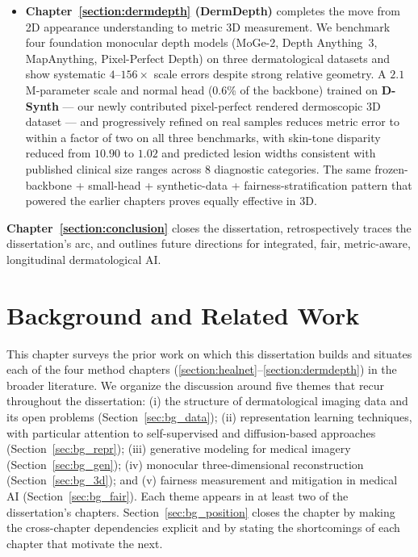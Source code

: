 \documentclass[11pt]{ucthesis}
\begin{document}
\begin{itemize}
  \item \textbf{Chapter~\ref{section:dermdepth} (DermDepth)} completes the move from 2D appearance understanding to metric 3D measurement. We benchmark four foundation monocular depth models (MoGe-2, Depth Anything~3, MapAnything, Pixel-Perfect Depth) on three dermatological datasets and show systematic $4$--$156\times$ scale errors despite strong relative geometry. A $2.1$\,M-parameter scale and normal head (0.6\% of the backbone) trained on \textbf{D-Synth} --- our newly contributed pixel-perfect rendered dermoscopic 3D dataset --- and progressively refined on real samples reduces metric error to within a factor of two on all three benchmarks, with skin-tone disparity reduced from $10.90$ to $1.02$ and predicted lesion widths consistent with published clinical size ranges across $8$ diagnostic categories. The same frozen-backbone + small-head + synthetic-data + fairness-stratification pattern that powered the earlier chapters proves equally effective in 3D.
\end{itemize}

\textbf{Chapter~\ref{section:conclusion}} closes the dissertation, retrospectively traces the dissertation's arc, and outlines future directions for integrated, fair, metric-aware, longitudinal dermatological AI.

\chapter{Background and Related Work}\label{section:bg}

This chapter surveys the prior work on which this dissertation builds and situates each of the four method chapters (\ref{section:healnet}--\ref{section:dermdepth}) in the broader literature. We organize the discussion around five themes that recur throughout the dissertation: (i) the structure of dermatological imaging data and its open problems (Section~\ref{sec:bg_data}); (ii) representation learning techniques, with particular attention to self-supervised and diffusion-based approaches (Section~\ref{sec:bg_repr}); (iii) generative modeling for medical imagery (Section~\ref{sec:bg_gen}); (iv) monocular three-dimensional reconstruction (Section~\ref{sec:bg_3d}); and (v) fairness measurement and mitigation in medical AI (Section~\ref{sec:bg_fair}). Each theme appears in at least two of the dissertation's chapters. Section~\ref{sec:bg_position} closes the chapter by making the cross-chapter dependencies explicit and by stating the shortcomings of each chapter that motivate the next.
\end{document}
